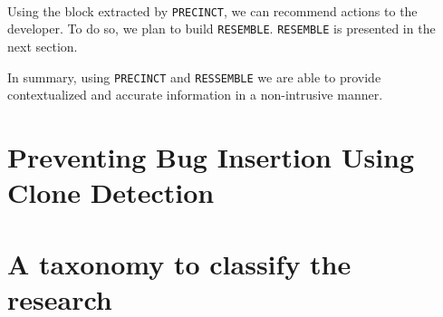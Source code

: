 

\\
Using the block extracted by {\tt PRECINCT}, we can recommend actions to the developer.
To do so, we plan to build {\tt RESEMBLE}.
{\tt RESEMBLE} is presented in the next section.




In summary, using {\tt PRECINCT} and {\tt RESSEMBLE} we are able to provide contextualized and accurate information in a non-intrusive manner.

\chapter{Preventing Bug Insertion Using Clone Detection}



\chapter{A taxonomy to classify the research\label{chap:taxonomy}}


